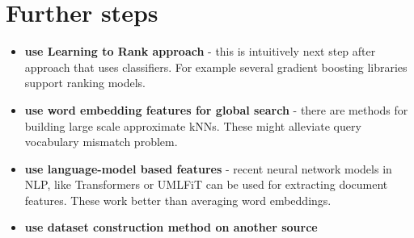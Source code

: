 \documentclass{article}
\begin{document}
\section{Further steps}
\begin{itemize}
    \item \textbf{use Learning to Rank approach} - this is intuitively next step after approach that uses classifiers. For example several gradient boosting libraries support ranking models.
    \item \textbf{use word embedding features for global search} - there are methods for building large scale approximate kNNs. These might alleviate query vocabulary mismatch problem.
    \item \textbf{use language-model based features} - recent neural network models in NLP, like Transformers or UMLFiT can be used for extracting document features. These work better than averaging word embeddings.
    \item \textbf{use dataset construction method on another source}
\end{itemize}



\end{document}
